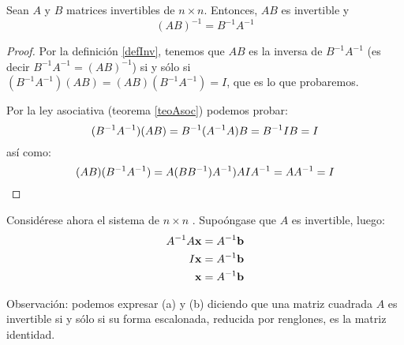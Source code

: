 \documentclass[alge.tex]{subfiles}
\begin{document}
\begin{teo}
  Sean \(A\) y \(B\) matrices invertibles de \(n\times n\). Entonces,
  \(AB\) es invertible y
  \[(AB)^{-1}=B^{-1}A^{-1}\]
\end{teo}

\begin{proof}
  Por la definici\'on \ref{defInv}, tenemos que \(AB\) es la inversa de
  \(B^{-1}A^{-1}\) (es decir \(B^{-1}A^{-1} = (AB)^{-1}\)) si y s\'olo
  si \((B^{-1}A^{-1})(AB)=(AB)(B^{-1}A^{-1}) = I\), que es lo que
  probaremos.

  Por la ley asociativa (teorema \ref{teoAsoc}) podemos probar:
  \[({B}^{-1}{A}^{-1})(AB)={B}^{-1}({A}^{-1} A)B = {B}^{-1}IB=I\]
  as\'i como:
  \[(AB)({B}^{-1}{A}^{-1})=A(B{B}^{-1}){A}^{-1}) AI{A}^{-1}=A{A}^{-1} = I\]
\end{proof}
Consid\'erese ahora el sistema de \(n \times n\) . Supo\'ongase
que \(A\) es invertible, luego:
\begin{align*}
  {A}^{-1}A\mathbf{x} &={A}^{-1}\mathbf{b}\\
  I\mathbf{x} &={A}^{-1}\mathbf{b}\\
  \mathbf{x} &={A}^{-1}\mathbf{b}\\
\end{align*}

\vspace{.25cm}

\vspace{1cm}

\vspace{1cm}
Observaci\'on: podemos expresar (a) y (b) diciendo que una matriz
cuadrada \(A\) es invertible si y s\'olo si su forma escalonada,
reducida por renglones, es la matriz identidad.
\end{document}
